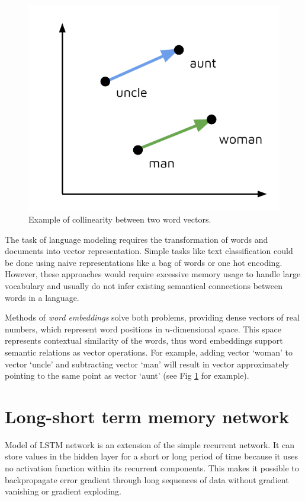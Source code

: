\begin{figure}[h]
\centering
\includegraphics{Figures/word_embeddings}
\decoRule
\caption[Word vectors]{Example of collinearity between two word vectors.}
\label{fig:word_embeddings}
\end{figure}

The task of language modeling requires the transformation of words and documents into vector representation. Simple tasks like text classification could be done using naive representations like a bag of words or one hot encoding. However, these approaches would require excessive memory usage to handle large vocabulary and usually do not infer existing semantical connections between words in a language. 

Methods of \emph{word embeddings} solve both problems, providing dense vectors of real numbers, which represent word positions in $n$-dimensional space. This space represents contextual similarity of the words, thus word embeddings support semantic relations as vector operations. For example, adding vector ‘woman’ to vector ‘uncle’ and subtracting vector ‘man’ will result in vector approximately pointing to the same point as vector ‘aunt’ (see Fig \ref{fig:word_embeddings} for example).

\section{Long-short term memory network}
Model of LSTM network is an extension of the simple recurrent network. It can store values in the hidden layer for a short or long period of time because it uses no activation function within its recurrent components. This makes it possible to backpropagate error gradient through long sequences of data without gradient vanishing or gradient exploding.

